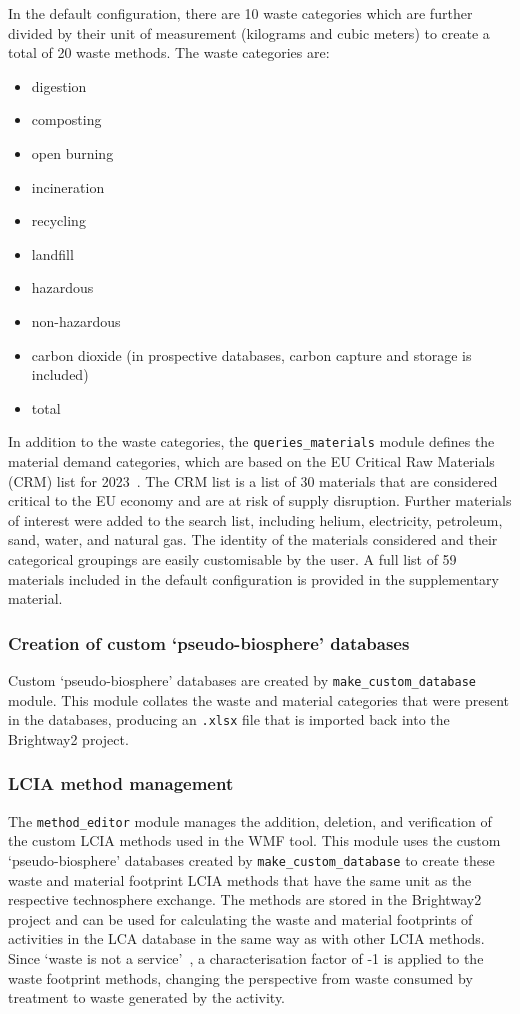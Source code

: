 In the default configuration, there are 10 waste categories which are further divided by their unit of measurement (kilograms and cubic meters) to create a total of 20 waste methods. The waste categories are:
\begin{itemize}[itemsep=0pt]
    \item digestion
    \item composting
    \item open burning
    \item incineration
    \item recycling
    \item landfill
    \item hazardous
    \item non-hazardous
    \item carbon dioxide (in prospective databases, carbon capture and storage is included)
    \item total
\end{itemize}

In addition to the waste categories, the \texttt{queries\_materials} module defines the material demand categories, which are based on the EU Critical Raw Materials (CRM) list for 2023~\citep{eu2023crmstudy}. The CRM list is a list of 30 materials that are considered critical to the EU economy and are at risk of supply disruption. Further materials of interest were added to the search list, including helium, electricity, petroleum, sand, water, and natural gas. The identity of the materials considered and their categorical groupings are easily customisable by the user. A full list of 59 materials included in the default configuration is provided in the supplementary material. 

\subsubsection{Creation of custom `pseudo-biosphere' databases}
Custom `pseudo-biosphere' databases are created by \texttt{make\_custom\_database} module. This module collates the waste and material categories that were present in the databases, producing an \texttt{.xlsx} file that is imported back into the Brightway2 project. 

\subsubsection{LCIA method management}
The \texttt{method\_editor} module manages the addition, deletion, and verification of the custom LCIA methods used in the WMF tool. This module uses the custom `pseudo-biosphere' databases created by \texttt{make\_custom\_database} to create these waste and material footprint LCIA methods that have the same unit as the respective technosphere exchange. The methods are stored in the Brightway2 project and can be used for calculating the waste and material footprints of activities in the LCA database in the same way as with other LCIA methods. Since `waste is not a service'~\citep{guinee2021wasteisnotaservice}, a characterisation factor of -1 is applied to the waste footprint methods, changing the perspective from waste consumed by treatment to waste generated by the activity.

